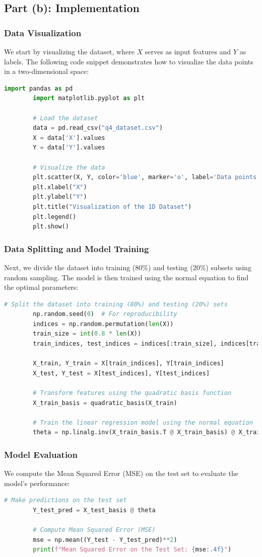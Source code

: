 \documentclass{article}
\begin{document}
	\subsection*{Part (b): Implementation}
	
	\subsubsection*{Data Visualization}
	We start by visualizing the dataset, where \( X \) serves as input features and \( Y \) as labels. The following code snippet demonstrates how to visualize the data points in a two-dimensional space:
	\begin{lstlisting}[language=Python]
		import pandas as pd
		import matplotlib.pyplot as plt
		
		# Load the dataset
		data = pd.read_csv("q4_dataset.csv")
		X = data['X'].values
		Y = data['Y'].values
		
		# Visualize the data
		plt.scatter(X, Y, color='blue', marker='o', label='Data points')
		plt.xlabel("X")
		plt.ylabel("Y")
		plt.title("Visualization of the 1D Dataset")
		plt.legend()
		plt.show()
	\end{lstlisting}
	
	\subsubsection*{Data Splitting and Model Training}
	Next, we divide the dataset into training (80\%) and testing (20\%) subsets using random sampling. The model is then trained using the normal equation to find the optimal parameters:
	\begin{lstlisting}[language=Python]
		# Split the dataset into training (80%) and testing (20%) sets
		np.random.seed(0)  # For reproducibility
		indices = np.random.permutation(len(X))
		train_size = int(0.8 * len(X))
		train_indices, test_indices = indices[:train_size], indices[train_size:]
		
		X_train, Y_train = X[train_indices], Y[train_indices]
		X_test, Y_test = X[test_indices], Y[test_indices]
		
		# Transform features using the quadratic basis function
		X_train_basis = quadratic_basis(X_train)
		
		# Train the linear regression model using the normal equation
		theta = np.linalg.inv(X_train_basis.T @ X_train_basis) @ X_train_basis.T @ Y_train
	\end{lstlisting}
	
	\subsubsection*{Model Evaluation}
	We compute the Mean Squared Error (MSE) on the test set to evaluate the model's performance:
	\begin{lstlisting}[language=Python]
		# Make predictions on the test set
		Y_test_pred = X_test_basis @ theta
		
		# Compute Mean Squared Error (MSE)
		mse = np.mean((Y_test - Y_test_pred)**2)
		print(f"Mean Squared Error on the Test Set: {mse:.4f}")
	\end{lstlisting}
	
\end{document}
